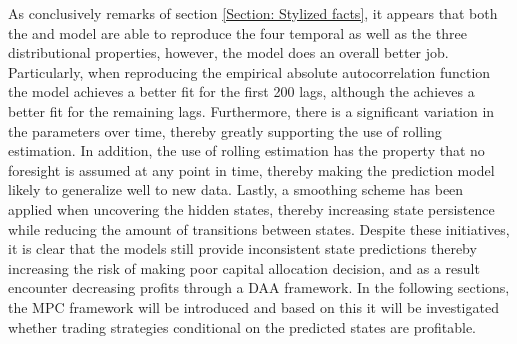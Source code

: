 As conclusively remarks of section \ref{Section: Stylized facts}, it appears that both the \mle and \jump model are able to reproduce the four temporal as well as the three distributional properties, however, the \jump model does an overall better job. Particularly, when reproducing the empirical absolute autocorrelation function the \jump model achieves a better fit for the first 200 lags, although the \mle achieves a better fit for the remaining lags. Furthermore, there is a significant variation in the parameters over time, thereby greatly supporting the use of rolling estimation. In addition, the use of rolling estimation has the property that no foresight is assumed at any point in time, thereby making the prediction model likely to generalize well to new data. Lastly, a smoothing scheme has been applied when uncovering the hidden states, thereby increasing state persistence while reducing the amount of transitions between states. Despite these initiatives, it is clear that the models still provide inconsistent state predictions thereby increasing the risk of making poor capital allocation decision, and as a result encounter decreasing profits through a DAA framework. In the following sections, the MPC framework will be introduced and based on this it will be investigated whether trading strategies conditional on the predicted states are profitable.
